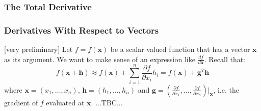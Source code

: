 


%

\subsubsection{The Total Derivative}






\subsubsection{Derivatives With Respect to Vectors}  [very preliminary]
Let $f = f(\mathbf{x})$ be a scalar valued function that has a vector $\mathbf{x}$ as its argument. We want to make sense of an expression like $\frac{d f}{d \mathbf{x}}$. Recall that:
\begin{equation}
f(\mathbf{x + h}) \approx 
f(\mathbf{x}) + \sum_{i=1}^{n} \frac{\partial f}{\partial x_i} h_i =
f(\mathbf{x}) + \mathbf{g}^T \mathbf{h}
\end{equation}
where $\mathbf{x} = (x_1,\ldots,x_n)$, $\mathbf{h} = (h_1,\ldots,h_n)$ and $\mathbf{g} = (\frac{\partial f}{\partial x_1},\ldots,\frac{\partial f}{\partial x_n})|_{\mathbf{x}}$, i.e. the gradient of $f$ evaluated at $\mathbf{x}$. ...TBC...


